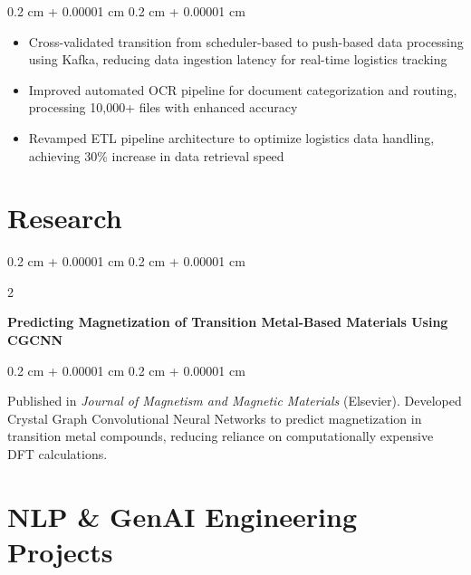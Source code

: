 \documentclass[10pt, letterpaper]{article}
\newenvironment{highlights}{
    \begin{itemize}[
        topsep=0.10 cm,
        parsep=0.10 cm,
        partopsep=0pt,
        itemsep=0pt,
        leftmargin=0.4 cm + 10pt
    ]
}{
    \end{itemize}
}
\newenvironment{onecolentry}{
    \begin{adjustwidth}{
        0.2 cm + 0.00001 cm
    }{
        0.2 cm + 0.00001 cm
    }
}{
    \end{adjustwidth}
}
\newenvironment{twocolentry}[2][]{
    \onecolentry
    \def\secondColumn{#2}
    \setcolumnwidth{\fill, 4.5 cm}
    \begin{paracol}{2}
}{
    \switchcolumn \raggedleft \secondColumn
    \end{paracol}
    \endonecolentry
}
\let\hrefWithoutArrow\href
\renewcommand{\href}[2]{\hrefWithoutArrow{#1}{\ifthenelse{\equal{#2}{}}{ }{#2 }\raisebox{.15ex}{\footnotesize \faExternalLink*}}}
\begin{document}
        \vspace{0.10 cm}
        \begin{onecolentry}
            \begin{highlights}
                \item Cross-validated transition from scheduler-based to push-based data processing using Kafka, reducing data ingestion latency for real-time logistics tracking
                \item Improved automated OCR pipeline for document categorization and routing, processing 10,000+ files with enhanced accuracy
                \item Revamped ETL pipeline architecture to optimize logistics data handling, achieving 30\% increase in data retrieval speed
            \end{highlights}
        \end{onecolentry}

    \section{Research}

        \begin{twocolentry}{\textit{\href{https://www.sciencedirect.com/science/article/abs/pii/S0304885325007735}{Sep 2025}}}
            \textbf{Predicting Magnetization of Transition Metal-Based Materials Using CGCNN}
        \end{twocolentry}
        
        \vspace{0.05 cm}
        \begin{onecolentry}
            Published in \textit{Journal of Magnetism and Magnetic Materials} (Elsevier). Developed Crystal Graph Convolutional Neural Networks to predict magnetization in transition metal compounds, reducing reliance on computationally expensive DFT calculations.
        \end{onecolentry}
\vspace{0.3 cm}
    \section{NLP \& GenAI Engineering Projects}

        \vspace{0.1 cm}
\end{document}
